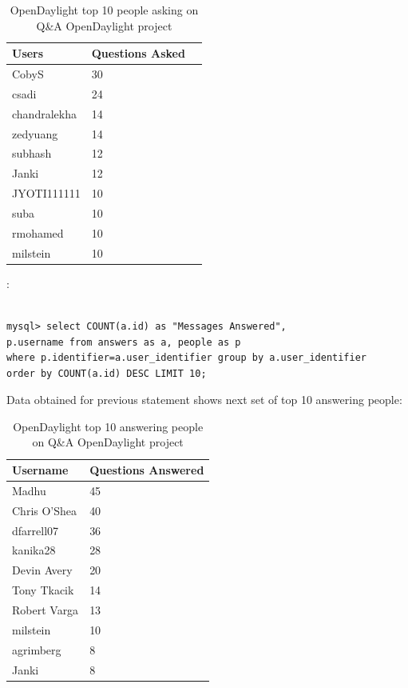 \documentclass[a4paper, 12pt]{book}
\begin{document}
{\begin{table}[H]
\footnotesize
\begin{center}
\begin{tabular}{|l|l|p{3cm}|}
\hline
\textbf{Users}  & \textbf{Questions Asked} \\ \hline
CobyS         & 30 \\ \hline
csadi         & 24 \\ \hline
chandralekha  & 14 \\ \hline
zedyuang      & 14 \\ \hline
subhash       & 12 \\ \hline
Janki         & 12 \\ \hline
JYOTI111111   & 10 \\ \hline
suba          & 10 \\ \hline
rmohamed      & 10 \\ \hline
milstein      & 10 \\ \hline
\end{tabular}
\end{center}
\caption{OpenDaylight top 10 people asking on Q\&A OpenDaylight project}
\label{tab:odl_top_people_asking}
\end{table}
:

\begin{verbatim}

mysql> select COUNT(a.id) as "Messages Answered",
p.username from answers as a, people as p
where p.identifier=a.user_identifier group by a.user_identifier
order by COUNT(a.id) DESC LIMIT 10;

\end{verbatim}
Data obtained for previous statement shows next set of top 10 answering people:
\begin{table}[H]
\footnotesize
\begin{center}
\begin{tabular}{|p{3cm}|l|}
\hline
\textbf{Username} & \textbf{Questions Answered} \\ \hline
Madhu        & 45\\ \hline
Chris O'Shea & 40\\ \hline
dfarrell07   & 36\\ \hline
kanika28     & 28\\ \hline
Devin Avery  & 20\\ \hline
Tony Tkacik  & 14\\ \hline
Robert Varga & 13\\ \hline
milstein     & 10\\ \hline
agrimberg    & 8 \\ \hline
Janki        & 8 \\ \hline
\end{tabular}
\end{center}
\caption{OpenDaylight top 10 answering people on Q\&A OpenDaylight project}
\label{tab:odl_top_people_answering}
\end{table}

}
\end{document}
